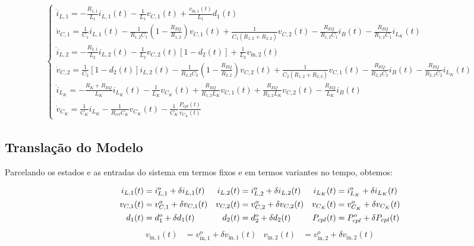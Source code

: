 \begin{gather}
  \begin{cases}
    \dot{i}_{L,1} = - \frac{R_{1,1}}{L_1} i_{L,1}(t) - \frac{1}{L_1} v_{C,1}(t) + \frac{v_{\text{in}, 1}(t)}{L_1} d_1(t)                                                                                                                        \\[12pt]
    \dot{v}_{C,1} = \frac{1}{C_1} i_{L,1}(t) - \frac{1}{R_{1,2}C_1} \left(1  - \frac{R_{EQ}}{R_{1,2}}\right) v_{C,1}(t) +\frac{1}{C_1 (R_{1,2} + R_{2,2})} v_{C,2}(t) - \frac{R_{EQ}}{R_{1,2}C_1} i_B(t) - \frac{R_{EQ}}{R_{1,2}C_1} i_{L_K}(t) \\[12pt]
    \dot{i}_{L,2} = - \frac{R_{2,1}}{L_2} i_{L,2}(t) - \frac{1}{L_2} v_{C,2}(t) \left[1 - d_2(t)\right] + \frac{1}{L_2} v_{\text{in}, 2}(t)                                                                                                     \\[12pt]
    \dot{v}_{C,2} = \frac{1}{C_2} \left[1 - d_2(t)\right] i_{L,2}(t)
    - \frac{1}{R_{2,2} C_2} \left(1 - \frac{R_{EQ}}{R_{2,2}}\right) v_{C,2}(t)
    + \frac{1}{C_2 (R_{1,2} + R_{2,2})} v_{C,1}(t)
    - \frac{R_{EQ}}{R_{2,2}C_2} i_B(t) - \frac{R_{EQ}}{R_{2,2}C_2} i_{L_K}(t)                                                                                                                                                              \\[12pt]
    \dot{i}_{L_K} = - \frac{R_K + R_{EQ}}{L_K} i_{L_K}(t) - \frac{1}{L_K} v_{C_K}(t) + \frac{R_{EQ}}{R_{1,2} L_K} v_{C,1}(t) + \frac{R_{EQ}}{R_{2,2} L_K} v_{C,2}(t) - \frac{R_{EQ}}{L_K} i_B(t)                                                \\[12pt]
    \dot{v}_{C_K} = \frac{1}{C_K} i_{L_K} - \frac{1}{R_{crl} C_K} v_{C_K}(t) - \frac{1}{C_K} \frac{P_{cpl}(t)}{v_{C_K}(t)}
  \end{cases}
\end{gather}


\subsection*{Translação do Modelo}

Parcelando os estados e as entradas do sistema em termos fixos e em termos variantes no tempo, obtemos:

\begin{align*}
  i_{L,1}(t) & = i_{L,1}^o + \delta i_{L,1}(t) & i_{L,2}(t) & = i_{L,2}^o + \delta i_{L,2}(t) & i_{L_K}(t) & = i_{L_K}^o + \delta i_{L_K}(t) \nle
  v_{C,1}(t) & = v_{C,1}^o + \delta v_{C,1}(t) & v_{C,2}(t) & = v_{C,2}^o + \delta v_{C,2}(t) & v_{C_K}(t) & = v_{C_K}^o + \delta v_{C_K}(t) \nle
  d_1(t)     & = d_1^o + \delta d_1(t)         & d_2(t)     & = d_2^o + \delta d_2(t)         & P_{cpl}(t) & = P_{cpl}^o + \delta P_{cpl}(t) \nle
\end{align*}
\begin{align}
  v_{\text{in},1}(t)     & = v_{\text{in},1}^o + \delta v_{\text{in},1}(t)         & v_{\text{in},2}(t)     & = v_{\text{in},2}^o + \delta v_{\text{in},2}(t)
\end{align}

